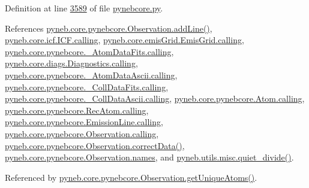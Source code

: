Definition at line \hyperlink{pynebcore_8py_source_l03589}{3589} of file \hyperlink{pynebcore_8py_source}{pynebcore.\+py}.



References \hyperlink{pynebcore_8py_source_l03436}{pyneb.\+core.\+pynebcore.\+Observation.\+add\+Line()}, \hyperlink{icf_8py_source_l00016}{pyneb.\+core.\+icf.\+I\+C\+F.\+calling}, \hyperlink{emis_grid_8py_source_l00041}{pyneb.\+core.\+emis\+Grid.\+Emis\+Grid.\+calling}, \hyperlink{pynebcore_8py_source_l00090}{pyneb.\+core.\+pynebcore.\+\_\+\+Atom\+Data\+Fits.\+calling}, \hyperlink{diags_8py_source_l00169}{pyneb.\+core.\+diags.\+Diagnostics.\+calling}, \hyperlink{pynebcore_8py_source_l00311}{pyneb.\+core.\+pynebcore.\+\_\+\+Atom\+Data\+Ascii.\+calling}, \hyperlink{pynebcore_8py_source_l00568}{pyneb.\+core.\+pynebcore.\+\_\+\+Coll\+Data\+Fits.\+calling}, \hyperlink{pynebcore_8py_source_l00918}{pyneb.\+core.\+pynebcore.\+\_\+\+Coll\+Data\+Ascii.\+calling}, \hyperlink{pynebcore_8py_source_l01175}{pyneb.\+core.\+pynebcore.\+Atom.\+calling}, \hyperlink{pynebcore_8py_source_l02572}{pyneb.\+core.\+pynebcore.\+Rec\+Atom.\+calling}, \hyperlink{pynebcore_8py_source_l03263}{pyneb.\+core.\+pynebcore.\+Emission\+Line.\+calling}, \hyperlink{pynebcore_8py_source_l03419}{pyneb.\+core.\+pynebcore.\+Observation.\+calling}, \hyperlink{pynebcore_8py_source_l03906}{pyneb.\+core.\+pynebcore.\+Observation.\+correct\+Data()}, \hyperlink{pynebcore_8py_source_l03421}{pyneb.\+core.\+pynebcore.\+Observation.\+names}, and \hyperlink{misc_8py_source_l00260}{pyneb.\+utils.\+misc.\+quiet\+\_\+divide()}.



Referenced by \hyperlink{pynebcore_8py_source_l03578}{pyneb.\+core.\+pynebcore.\+Observation.\+get\+Unique\+Atoms()}.


